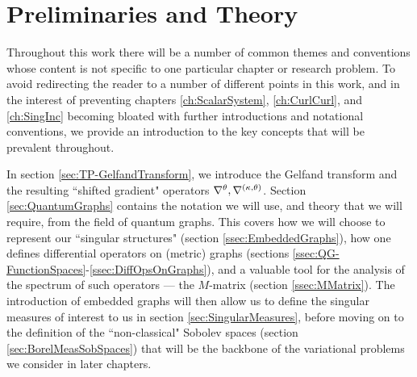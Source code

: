 \chapter{Preliminaries and Theory} \label{ch:TheoryPrelims}
Throughout this work there will be a number of common themes and conventions whose content is not specific to one particular chapter or research problem.
To avoid redirecting the reader to a number of different points in this work, and in the interest of preventing chapters \ref{ch:ScalarSystem}, \ref{ch:CurlCurl}, and \ref{ch:SingInc} becoming bloated with further introductions and notational conventions, we provide an introduction to the key concepts that will be prevalent throughout.

In section \ref{sec:TP-GelfandTransform}, we introduce the Gelfand transform and the resulting ``shifted gradient" operators $\nabla^{\theta}, \nabla^{\left( \kappa, \theta \right)}$.
Section \ref{sec:QuantumGraphs} contains the notation we will use, and theory that we will require, from the field of quantum graphs.
This covers how we will choose to represent our ``singular structures" (section \ref{ssec:EmbeddedGraphs}), how one defines differential operators on (metric) graphs (sections \ref{ssec:QG-FunctionSpaces}-\ref{ssec:DiffOpsOnGraphs}), and a valuable tool for the analysis of the spectrum of such operators --- the $M$-matrix (section \ref{ssec:MMatrix}).
The introduction of embedded graphs will then allow us to define the singular measures of interest to us in section \ref{sec:SingularMeasures}, before moving on to the definition of the ``non-classical" Sobolev spaces (section \ref{sec:BorelMeasSobSpaces}) that will be the backbone of the variational problems we consider in later chapters.







